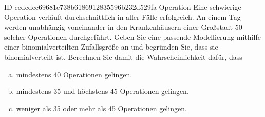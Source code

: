 \begin{exercise}
      {ID-cedcdec69681e738b6186912835596b232d529fa}
      {Operation}
  \ifproblem\problem
    Eine schwierige Operation verläuft durchschnittlich in  aller
    Fälle erfolgreich. An einem Tag werden unabhängig voneinander in den
    Krankenhäusern einer Großstadt 50 solcher Operationen durchgeführt.
    Geben Sie eine passende Modellierung mithilfe einer binomialverteilten
    Zufallsgröße an und begründen Sie, dass sie binomialverteilt ist.
    Berechnen Sie damit die Wahrscheinlichkeit dafür, dass
    \begin{enumerate}[a)]
      \item mindestens 40 Operationen gelingen.
      \item mindestens 35 und höchstens 45 Operationen gelingen.
      \item weniger als 35 oder mehr als 45 Operationen gelingen.
    \end{enumerate}
  \fi
\end{exercise}
